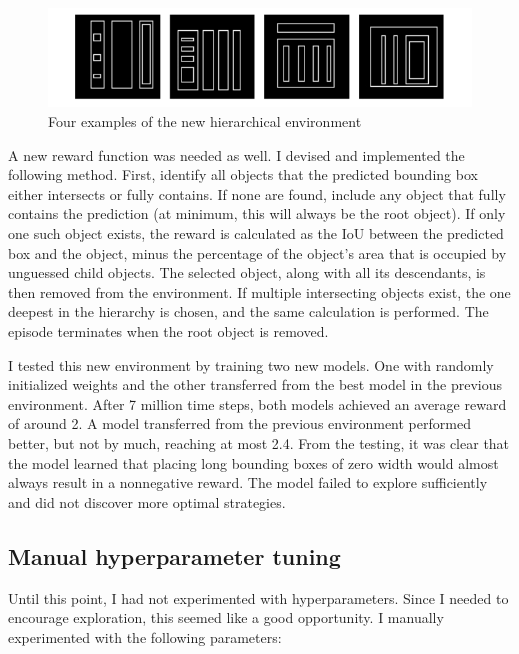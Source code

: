\documentclass[
  digital,     %
  oneside,     %
  nosansbold,  %
  nocolorbold, %
  lof,         %
  lot,         %
]{fithesis4}
\begin{document}
\begin{figure}
    \centering
    \includegraphics[width=1\linewidth]{env_examples/env7.pdf}
    \caption{Four examples of the new hierarchical environment}
    \label{fig:env7}
\end{figure}

A new reward function was needed as well. I devised and implemented the following method. First, identify all objects that the predicted bounding box either intersects or fully contains. If none are found, include any object that fully contains the prediction (at minimum, this will always be the root object). If only one such object exists, the reward is calculated as the IoU between the predicted box and the object, minus the percentage of the object’s area that is occupied by unguessed child objects. The selected object, along with all its descendants, is then removed from the environment. If multiple intersecting objects exist, the one deepest in the hierarchy is chosen, and the same calculation is performed. The episode terminates when the root object is removed.

I tested this new environment by training two new models. One with randomly initialized weights and the other transferred from the best model in the previous environment. After 7 million time steps, both models achieved an average reward of around 2. A model transferred from the previous environment performed better, but not by much, reaching at most 2.4. From the testing, it was clear that the model learned that placing long bounding boxes of zero width would almost always result in a nonnegative reward. The model failed to explore sufficiently and did not discover more optimal strategies.

\subsection{Manual hyperparameter tuning}

Until this point, I had not experimented with hyperparameters. Since I needed to encourage exploration, this seemed like a good opportunity. I manually experimented with the following parameters:
\end{document}
